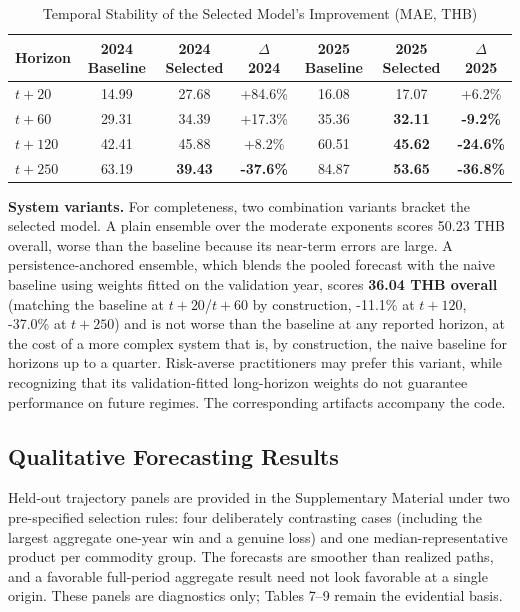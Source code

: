 \documentclass[review,3p,times]{elsarticle}
\begin{document}
\begin{table}[htbp]\centering
\caption{Temporal Stability of the Selected Model's Improvement (MAE, THB)}
\small
\begin{tabular}{lcccccc}
\toprule
Horizon & 2024 Baseline & 2024 Selected & $\Delta$ 2024 & 2025 Baseline & 2025 Selected & $\Delta$ 2025 \\
\midrule
$t+20$ & 14.99 & 27.68 & +84.6\% & 16.08 & 17.07 & +6.2\% \\
$t+60$ & 29.31 & 34.39 & +17.3\% & 35.36 & \textbf{32.11} & \textbf{-9.2\%} \\
$t+120$ & 42.41 & 45.88 & +8.2\% & 60.51 & \textbf{45.62} & \textbf{-24.6\%} \\
$t+250$ & 63.19 & \textbf{39.43} & \textbf{-37.6\%} & 84.87 & \textbf{53.65} & \textbf{-36.8\%} \\
\bottomrule
\end{tabular}
\end{table}

\textbf{System variants.} For completeness, two combination variants bracket the selected model. A plain ensemble over the moderate exponents scores 50.23 THB overall, worse than the baseline because its near-term errors are large. A persistence-anchored ensemble, which blends the pooled forecast with the naive baseline using weights fitted on the validation year, scores \textbf{36.04 THB overall} (matching the baseline at $t+20$/$t+60$ by construction, -11.1\% at $t+120$, -37.0\% at $t+250$) and is not worse than the baseline at any reported horizon, at the cost of a more complex system that is, by construction, the naive baseline for horizons up to a quarter. Risk-averse practitioners may prefer this variant, while recognizing that its validation-fitted long-horizon weights do not guarantee performance on future regimes. The corresponding artifacts accompany the code.

\subsection{Qualitative Forecasting Results}

Held-out trajectory panels are provided in the Supplementary Material under two pre-specified selection rules: four deliberately contrasting cases (including the largest aggregate one-year win and a genuine loss) and one median-representative product per commodity group. The forecasts are smoother than realized paths, and a favorable full-period aggregate result need not look favorable at a single origin. These panels are diagnostics only; Tables 7--9 remain the evidential basis.
\end{document}
